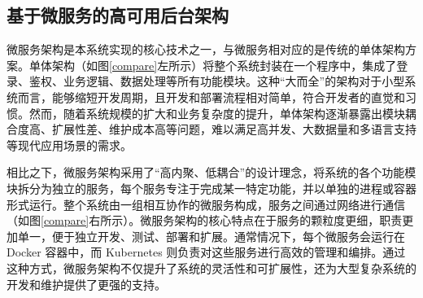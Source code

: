 \documentclass[UTF8,a4paper,12pt]{ctexart}
\numberwithin{equation}{section}
\begin{document}
\subsection{基于微服务的高可用后台架构}
微服务架构是本系统实现的核心技术之一，与微服务相对应的是传统的单体架构方案。单体架构（如图\ref{compare}左所示）\cite{ref18.5}将整个系统封装在一个程序中，集成了登录、鉴权、业务逻辑、数据处理等所有功能模块。这种“大而全”的架构对于小型系统而言，能够缩短开发周期，且开发和部署流程相对简单，符合开发者的直觉和习惯。然而，随着系统规模的扩大和业务复杂度的提升，单体架构逐渐暴露出模块耦合度高、扩展性差、维护成本高等问题，难以满足高并发、大数据量和多语言支持等现代应用场景的需求。\par
相比之下，微服务架构采用了“高内聚、低耦合”的设计理念，将系统的各个功能模块拆分为独立的服务，每个服务专注于完成某一特定功能，并以单独的进程或容器形式运行。整个系统由一组相互协作的微服务构成，服务之间通过网络进行通信（如图\ref{compare}右所示）。微服务架构的核心特点在于服务的颗粒度更细，职责更加单一，便于独立开发、测试、部署和扩展。通常情况下，每个微服务会运行在 Docker 容器中，而 Kubernetes 则负责对这些服务进行高效的管理和编排。通过这种方式，微服务架构不仅提升了系统的灵活性和可扩展性，还为大型复杂系统的开发和维护提供了更强的支持。\par
\end{document}
